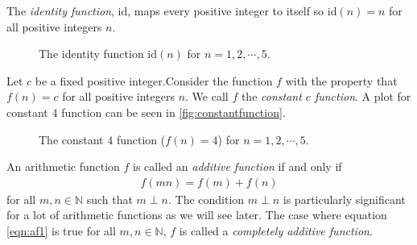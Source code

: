 	\begin{definition}
		The \textit{identity function}, $\text{id}$, maps every positive integer to itself so $\text{id}(n)=n$ for all positive integers $n$. %
		\begin{figure}
			\centering
			\caption{The identity function $\text{id}(n)$ for $n=1,2,\cdots,5$.}
			\label{fig:identityfunction}
		\end{figure}
	\end{definition}

	\begin{definition}
		Let $c$ be a fixed positive integer.Consider the function $f$ with the property that $f(n)=c$ for all positive integers $n$. We call $f$ the \textit{constant $c$ function}. A plot for constant $4$ function can be seen in \autoref{fig:constantfunction}.

		\begin{figure}
			\centering
			\caption{The constant $4$ function ($f(n)=4$) for $n=1,2,\cdots,5$.}
			\label{fig:constantfunction}
		\end{figure}
	\end{definition}
	\begin{definition}
		An arithmetic function $f$ is called an \textit{additive function} if and only if
			\begin{align}
				f(mn)=f(m)+f(n)\label{eqn:af1}
			\end{align}
		for all $m,n\in\mathbb{N}$ such that $m\perp n$. The condition $m\perp n$ is particularly significant for a lot of arithmetic functions as we will see later. The case where equation \ref{eqn:af1} is true for all $m,n\in\mathbb{N}$, $f$ is called a \textit{completely additive function}.
	\end{definition}

